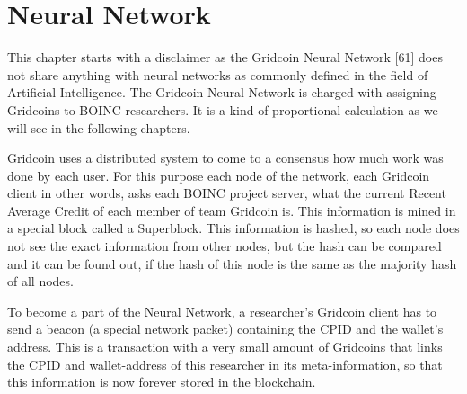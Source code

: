 \section{Neural Network}

This chapter starts with a disclaimer as the Gridcoin Neural Network [61] does not share anything with neural networks as commonly defined in the field of Artificial Intelligence. The Gridcoin Neural Network is charged with assigning Gridcoins to BOINC researchers. It is a kind of proportional calculation as we will see in the following chapters.

Gridcoin uses a distributed system to come to a consensus how much work was done by each user. For this purpose each node of the network, each Gridcoin client in other words, asks each BOINC project server, what the current Recent Average Credit of each member of team Gridcoin is. This information is mined in a special block called a Superblock. This information is hashed, so each node does not see the exact information from other nodes, but the hash can be compared and it can be found out, if the hash of this node is the same as the majority hash of all nodes.

To become a part of the Neural Network, a researcher's Gridcoin client has to send a beacon (a special network packet) containing the CPID and the wallet's address. This is a transaction with a very small amount of Gridcoins that links  the CPID  and wallet-address of this researcher in its meta-information, so that this information is now forever stored in the blockchain.

